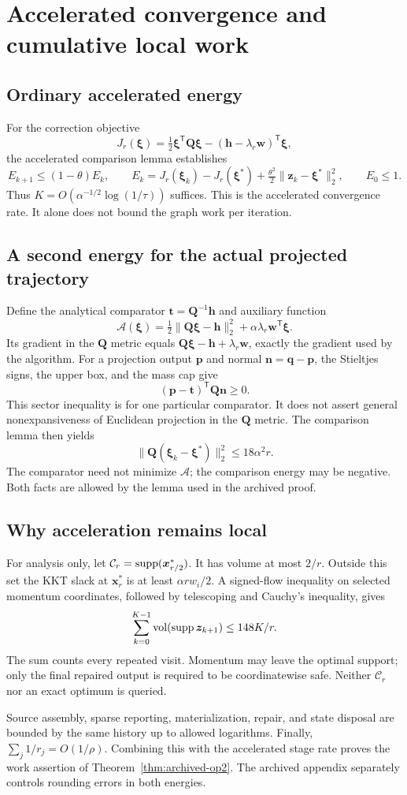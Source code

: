 \section{Accelerated convergence and cumulative local work}
\label{sec:note-proof-chain}
\subsection{Ordinary accelerated energy}
For the correction objective
\[
 J_r(\bm{\xi})=\tfrac12\bm{\xi}^{\mathsf T}\bm{Q}\bm{\xi}
                    -(\bm{h}-\lambda_r\bm{w})^{\mathsf T}\bm{\xi},
\]
the accelerated comparison lemma establishes
\[
 E_{k+1}\le(1-\theta)E_k,\qquad
 E_k=J_r(\bm{\xi}_k)-J_r(\bm{\xi}^*)
          +\tfrac{\theta^2}{2}\|\bm{z}_k-\bm{\xi}^*\|_2^2,
 \qquad E_0\le1.
\]
Thus $K=O(\alpha^{-1/2}\log(1/\tau))$ suffices. This is the accelerated
convergence rate. It alone does not bound the graph work per iteration.

\subsection{A second energy for the actual projected trajectory}
Define the analytical comparator $\bm{t}=\bm{Q}^{-1}\bm{h}$ and auxiliary
function
\[
 \mathcal A(\bm{\xi})
  =\tfrac12\|\bm{Q}\bm{\xi}-\bm{h}\|_2^2
     +\alpha\lambda_r\bm{w}^{\mathsf T}\bm{\xi}.
\]
Its gradient in the $\bm{Q}$ metric equals
$\bm{Q}\bm{\xi}-\bm{h}+\lambda_r\bm{w}$, exactly the gradient used by
the algorithm. For a projection output $\bm{p}$ and normal
$\bm{n}=\bm{q}-\bm{p}$, the Stieltjes signs, the upper box, and the mass cap
give
\[
 (\bm{p}-\bm{t})^{\mathsf T}\bm{Q}\bm{n}\ge0.
\]
This sector inequality is for one particular comparator. It does not assert
general nonexpansiveness of Euclidean projection in the $\bm{Q}$ metric.
The comparison lemma then yields
\[
 \|\bm{Q}(\bm{\xi}_k-\bm{\xi}^*)\|_2^2\le18\alpha^2r.
\]
The comparator need not minimize $\mathcal A$; the comparison energy may be
negative. Both facts are allowed by the lemma used in the archived proof.

\subsection{Why acceleration remains local}
For analysis only, let $\mathcal C_r=\operatorname{supp}(\bm{x}_{r/2}^*)$.
It has volume at most $2/r$. Outside this set the KKT slack at
$\bm{x}_r^*$ is at least $\alpha r w_i/2$.
A signed-flow inequality on selected momentum coordinates, followed by
telescoping and Cauchy's inequality, gives
\[
 \sum_{k=0}^{K-1}\operatorname{vol}(\operatorname{supp}\bm{z}_{k+1})\le148K/r.
\]
The sum counts every repeated visit. Momentum may leave the optimal support;
only the final repaired output is required to be coordinatewise safe.
Neither $\mathcal C_r$ nor an exact optimum is queried.

Source assembly, sparse reporting, materialization, repair, and state disposal
are bounded by the same history up to allowed logarithms. Finally,
$\sum_j1/r_j=O(1/\rho)$. Combining this with the accelerated stage rate
proves the work assertion of Theorem~\ref{thm:archived-op2}.
The archived appendix separately controls rounding errors in both energies.
